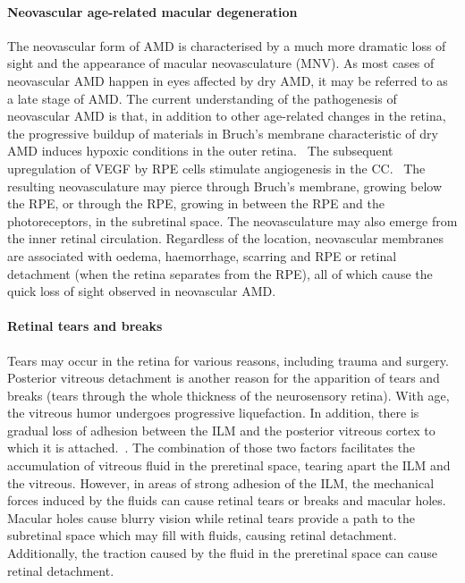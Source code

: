 \documentclass[12pt,a4paper]{journal}
\begin{document}
\paragraph*{Neovascular age-related macular degeneration}
The neovascular form of AMD is characterised by a much more dramatic loss of sight and the appearance of macular neovasculature (MNV).
As most cases of neovascular AMD happen in eyes affected by dry AMD, it may be referred to as a late stage of AMD.
The current understanding of the pathogenesis of neovascular AMD is that, in addition to other age-related changes in the retina, the progressive buildup of materials in Bruch's membrane characteristic of dry AMD induces hypoxic conditions in the outer retina.~\cite{Jager_2008,Newsom_2008}
The subsequent upregulation of VEGF by RPE cells stimulate angiogenesis in the CC.~\cite{Jager_2008}
The resulting neovasculature may pierce through Bruch's membrane, growing below the RPE, or through the RPE, growing in between the RPE and the photoreceptors, in the subretinal space.
The neovasculature may also emerge from the inner retinal circulation.
Regardless of the location, neovascular membranes are associated with oedema, haemorrhage, scarring and RPE or retinal detachment (when the retina separates from the RPE), all of which cause the quick loss of sight observed in neovascular AMD.~\cite{Gupta_2015,Jager_2008}\\

\paragraph*{Retinal tears and breaks}
Tears may occur in the retina for various reasons, including trauma and surgery.
Posterior vitreous detachment is another reason for the apparition of tears and breaks (tears through the whole thickness of the neurosensory retina).
With age, the vitreous humor undergoes progressive liquefaction.
In addition, there is gradual loss of adhesion between the ILM and the posterior vitreous cortex to which it is attached.~\cite{Bottos_2012,Medina_2016}.
The combination of those two factors facilitates the accumulation of vitreous fluid in the preretinal space, tearing apart the ILM and the vitreous.
However, in areas of strong adhesion of the ILM, the mechanical forces induced by the fluids can cause retinal tears or breaks and macular holes.~\cite{Shechtman_2009}
Macular holes cause blurry vision while retinal tears provide a path to the subretinal space which may fill with fluids, causing retinal detachment.~\cite{Medina_2016}
Additionally, the traction caused by the fluid in the preretinal space can cause retinal detachment.\\
\end{document}
